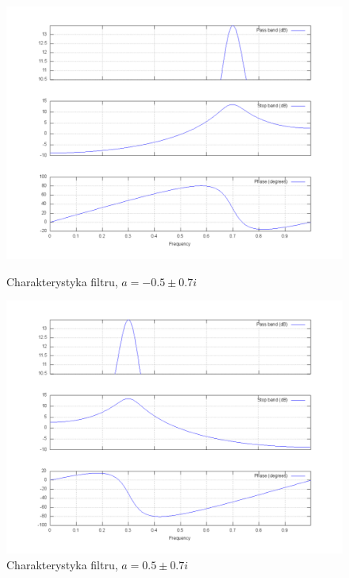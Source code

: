 \documentclass[wide,a4paper,titlepage,12pt]{mwart}
\begin{document}
  \begin{figure}[htbp]
    \begin{center}
      \includegraphics[scale=.3]{out/fig39.png}
      \caption{\label{fig39} Charakterystyka filtru, $a=-0.5\pm0.7i$}
      \includegraphics[scale=.3]{out/fig40.png}
      \caption{\label{fig40} Charakterystyka filtru, $a=0.5\pm0.7i$}
  
    \end{center}
  \end{figure}
\end{document}
